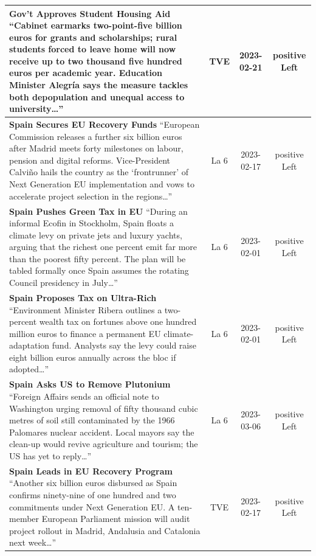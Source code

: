 \documentclass[12pt]{article}
\begin{document}
\begin{center}
\begin{longtable}{|p{8cm}|c|c|c|}
	\textbf{Gov’t Approves Student Housing Aid}\newline
	{\scriptsize“Cabinet earmarks two-point-five billion euros for grants and scholarships; rural students forced to leave home will now receive up to two thousand five hundred euros per academic year.  Education Minister Alegría says the measure tackles both depopulation and unequal access to university…”}
	& TVE & 2023-02-21 & positive Left\\
	\hline
	
	\textbf{Spain Secures EU Recovery Funds}\newline
	{\scriptsize“European Commission releases a further six billion euros after Madrid meets forty milestones on labour, pension and digital reforms.  Vice-President Calviño hails the country as the ‘frontrunner’ of Next Generation EU implementation and vows to accelerate project selection in the regions…”}
	& La 6 & 2023-02-17 & positive Left\\
	\hline
	
	\textbf{Spain Pushes Green Tax in EU}\newline
	{\scriptsize“During an informal Ecofin in Stockholm, Spain floats a climate levy on private jets and luxury yachts, arguing that the richest one percent emit far more than the poorest fifty percent.  The plan will be tabled formally once Spain assumes the rotating Council presidency in July…”}
	& La 6 & 2023-02-01 & positive Left\\
	\hline
	
	\textbf{Spain Proposes Tax on Ultra-Rich}\newline
	{\scriptsize“Environment Minister Ribera outlines a two-percent wealth tax on fortunes above one hundred million euros to finance a permanent EU climate-adaptation fund.  Analysts say the levy could raise eight billion euros annually across the bloc if adopted…”}
	& La 6 & 2023-02-01 & positive Left\\
	\hline
	
	\textbf{Spain Asks US to Remove Plutonium}\newline
	{\scriptsize“Foreign Affairs sends an official note to Washington urging removal of fifty thousand cubic metres of soil still contaminated by the 1966 Palomares nuclear accident.  Local mayors say the clean-up would revive agriculture and tourism; the US has yet to reply…”}
	& La 6 & 2023-03-06 & positive Left\\
	\hline
	
	\textbf{Spain Leads in EU Recovery Program}\newline
	{\scriptsize“Another six billion euros disbursed as Spain confirms ninety-nine of one hundred and two commitments under Next Generation EU.  A ten-member European Parliament mission will audit project rollout in Madrid, Andalusia and Catalonia next week…”}
	& TVE & 2023-02-17 & positive Left\\
	\hline
	

\end{longtable}
\end{center}
\end{document}
